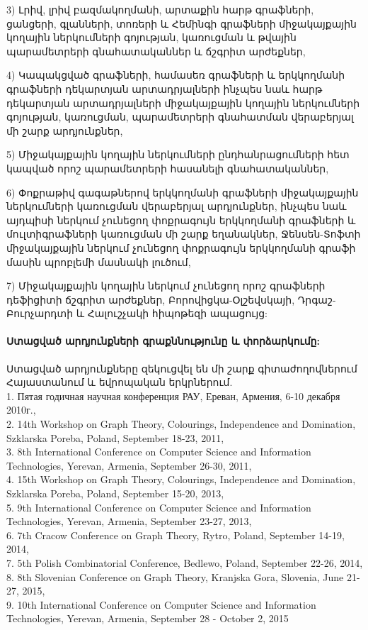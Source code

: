 3) Լրիվ, լրիվ բազմակողմանի, արտաքին հարթ գրաֆների, ցանցերի, գլանների, տոռերի և Հեմինգի գրաֆների միջակայքային կողային ներկումների գոյության, կառուցման և թվային պարամետրերի գնահատականներ և ճշգրիտ արժեքներ,

4) Կապակցված գրաֆների, համասեռ գրաֆների և երկկողմանի գրաֆների դեկարտյան արտադրյալների ինչպես նաև հարթ դեկարտյան արտադրյալների միջակայքային կողային ներկումների գոյության, կառուցման, պարամետրերի գնահատման վերաբերյալ մի շարք արդյունքներ,

5) Միջակայքային կողային ներկումների ընդհանրացումների հետ կապված որոշ պարամետրերի հասանելի գնահատականներ,

6) Փոքրաթիվ գագաթներով երկկողմանի գրաֆների միջակայքային ներկումների կառուցման վերաբերյալ արդյունքներ, ինչպես նաև այդպիսի ներկում չունեցող փոքրագույն երկկողմանի գրաֆների և մուլտիգրաֆների կառուցման մի շարք եղանակներ, Ջենսեն-Տոֆտի միջակայքային ներկում չունեցող փոքրագույն երկկողմանի գրաֆի մասին պրոբլեմի մասնակի լուծում,

7) Միջակայքային կողային ներկում չունեցող որոշ գրաֆների դեֆիցիտի ճշգրիտ արժեքներ, Բորովիցկա-Օլշեվսկայի, Դրգաշ-Բուրչարդտի և Հալուշչակի հիպոթեզի ապացույց:

\paragraph{Ստացված արդյունքների գրաքննությունը և փորձարկումը:}

Ստացված արդյունքները զեկուցվել են մի շարք գիտաժողովներում Հայաստանում և եվրոպական երկրներում.\\
1. Пятая годичная научная конференция РАУ, Ереван, Армения, 6-10 декабря 2010г.,\\
2. 14th Workshop on Graph Theory, Colourings, Independence and Domination, Szklarska Poreba, Poland, September 18-23, 2011,\\
3. 8th International Conference on Computer Science and Information Technologies, Yerevan, Armenia, September 26-30, 2011,\\
4. 15th Workshop on Graph Theory, Colourings, Independence and Domination, Szklarska Poreba, Poland, September 15-20, 2013,\\
5. 9th International Conference on Computer Science and Information Technologies, Yerevan, Armenia, September 23-27, 2013,\\
6. 7th Cracow Conference on Graph Theory, Rytro, Poland, September 14-19, 2014,\\
7. 5th Polish Combinatorial Conference, Bedlewo, Poland, September 22-26, 2014,\\
8. 8th Slovenian Conference on Graph Theory, Kranjska Gora, Slovenia, June 21-27, 2015,\\
9. 10th International Conference on Computer Science and Information Technologies, Yerevan, Armenia, September 28 - October 2, 2015

